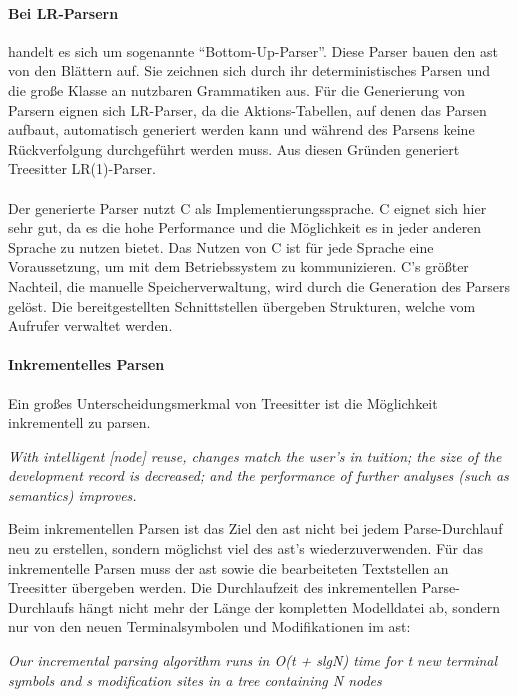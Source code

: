 \documentclass[./einleitung.tex]{subfiles}
\begin{document}
\paragraph[LR-Parsern]{Bei LR-Parsern}\label{par:lr-parser} handelt es sich um sogenannte ``Bottom-Up-Parser''.
Diese Parser bauen den \acrshort{ast} von den Blättern auf.
Sie zeichnen sich durch ihr deterministisches Parsen und die große Klasse an nutzbaren Grammatiken aus.\newline
Für die Generierung von Parsern eignen sich LR-Parser, da die Aktions-Tabellen, auf denen das Parsen aufbaut, automatisch generiert werden kann und während des Parsens keine Rückverfolgung durchgeführt werden muss. \cite{aho1974lr}
Aus diesen Gründen generiert Treesitter LR(1)-Parser.
\\\\
Der generierte Parser nutzt C als Implementierungssprache.
C eignet sich hier sehr gut, da es die hohe Performance und die Möglichkeit es in jeder anderen Sprache zu nutzen bietet.
Das Nutzen von C ist für jede Sprache eine Voraussetzung, um mit dem Betriebssystem zu kommunizieren.
C's größter Nachteil, die manuelle Speicherverwaltung, wird durch die Generation des Parsers gelöst.
Die bereitgestellten Schnittstellen übergeben Strukturen, welche vom Aufrufer verwaltet werden.
\paragraph{Inkrementelles Parsen}
Ein großes Unterscheidungsmerkmal von Treesitter ist die Möglichkeit inkrementell zu parsen.
\newline
 \begin{center}
 \textit{With intelligent [node] reuse, changes match the user’s in
tuition; the size of the development record is decreased; and the performance
 of further analyses (such as semantics) improves.\cite{twagner}}
 \end{center}
Beim inkrementellen Parsen ist das Ziel den \acrshort{ast} nicht bei jedem Parse-Durchlauf neu zu erstellen, sondern möglichst viel des \acrshort{ast}'s wiederzuverwenden.
Für das inkrementelle Parsen muss der \acrshort{ast} sowie die bearbeiteten Textstellen an Treesitter übergeben werden.
Die Durchlaufzeit des inkrementellen Parse-Durchlaufs hängt nicht mehr der Länge der kompletten Modelldatei ab, sondern nur von den neuen Terminalsymbolen und Modifikationen im \acrshort{ast}:
 \newline
 \begin{center}
 \textit{Our incremental parsing algorithm runs in O(t + slgN) time for t new terminal symbols and s modification sites in a tree containing N nodes \cite{twagner}}
 \end{center}
\end{document}
